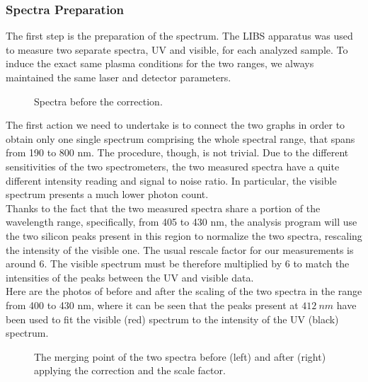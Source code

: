 \subsubsection{Spectra Preparation}
\label{subsubsec:spectra_preparation}
The first step is the preparation of the spectrum. The LIBS apparatus was used to measure two separate spectra, UV and visible, for each analyzed sample. To induce the exact same plasma conditions for the two ranges, we always maintained the same laser and detector parameters.


\begin{figure}[H]
    \centering
    \quad
    \caption{Spectra before the correction. }
    \label{fig:spectra_before_corr}
\end{figure}




The first action we need to undertake is to connect the two graphs in order to obtain only one single spectrum comprising the whole spectral range, that spans from 190 to 800 nm. The procedure, though, is not trivial. Due to the different sensitivities of the two spectrometers, the two measured spectra have a quite different intensity reading and signal to noise ratio. In particular, the visible spectrum presents a much lower photon count.
\\ 
Thanks to the fact that the two measured spectra share a portion of the wavelength range, specifically, from 405 to 430 nm, the analysis program will use the two silicon peaks present in this region to normalize the two spectra, rescaling the intensity of the visible one. The usual rescale factor for our measurements is around 6. The visible spectrum must be therefore multiplied by 6 to match the intensities of the peaks between the UV and visible data.
\\
Here are the photos of before and after the scaling of the two spectra in the range from 400 to 430 nm, where it can be seen that the peaks present at $412 \:nm$ have been used to fit the visible (red) spectrum to the intensity of the UV (black) spectrum.


\begin{figure}[H]
    \centering
    \quad
    \caption{The merging point of the two spectra before (left) and after (right) applying the correction and the scale factor. }
    \label{fig:spectra_mergin_point}
\end{figure}

